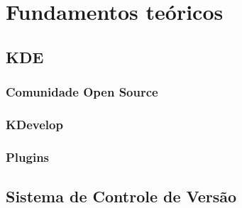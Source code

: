 \chapter{Fundamentos teóricos}
\lipsum[1-4]

\section{KDE}
\lipsum[1-4]

\subsection{Comunidade Open Source}
\lipsum[1-4]

\subsection{KDevelop}
\lipsum[1-4]

\subsection{Plugins}
\lipsum[1-4]

\section{Sistema de Controle de Versão}
\lipsum[1-4]
